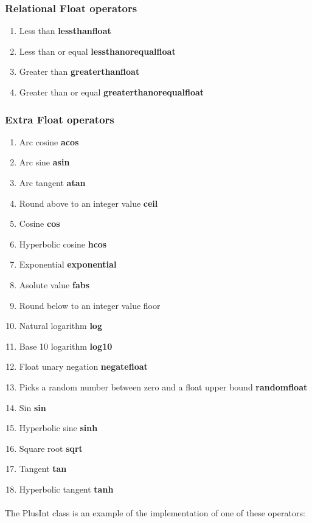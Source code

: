 \documentclass[12pt]{article}
\begin{document}
\subsubsection{Relational Float operators}
\begin{enumerate}
\item Less than   			  \textbf{lessthanfloat} 
\item Less than or equal   \textbf{lessthanorequalfloat} 
\item Greater than			  \textbf{greaterthanfloat} 
\item Greater than or equal  \textbf{greaterthanorequalfloat} 
\end{enumerate}

\subsubsection{Extra Float operators}
\begin{enumerate}
\item  Arc cosine 	\textbf{acos}
\item  Arc sine		\textbf{asin}
\item  Arc tangent  \textbf{atan}
\item  Round above to an integer value \textbf{ceil}
\item  Cosine  \textbf{cos}
\item  Hyperbolic cosine \textbf{hcos}
\item Exponential \textbf{exponential}
\item Asolute value \textbf{fabs}
\item Round below to an integer value {floor}
\item Natural logarithm \textbf{log}
\item Base 10 logarithm \textbf{log10}
\item Float unary negation  \textbf{negatefloat}
\item Picks a random number between zero and a float upper bound  \textbf{randomfloat}
\item Sin \textbf{sin}
\item Hyperbolic sine \textbf{sinh}
\item Square root \textbf{sqrt}
\item Tangent \textbf{tan}
\item Hyperbolic tangent \textbf{tanh}
\end{enumerate}



\paragraph{}
The PlusInt class is an example of the implementation of one of these operators:
\end{document}
